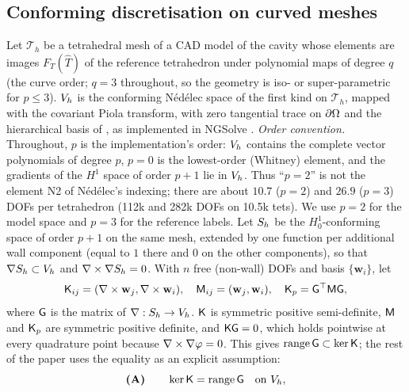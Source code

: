 \subsection{Conforming discretisation on curved meshes}\label{sec:03-discrete}
Let $\mathcal T_h$ be a tetrahedral mesh of a CAD model of the cavity \citep{schoberl1997netgen} whose elements are images
$F_T(\hat T)$ of the reference tetrahedron under polynomial maps of degree $q$ (the curve order; $q=3$ throughout, %
so the geometry is iso- or super-parametric for $p\le 3$). $V_h$ is the conforming Nédélec space of the first kind \citep{nedelec1980mixed} on $\mathcal T_h$, mapped with the covariant Piola transform, with zero
tangential trace on $\partial\Omega$ and the hierarchical basis of \citet{schoberl2005high}, as implemented in NGSolve \citep{schoberl2014cpp11}.
\emph{Order convention.} Throughout, $p$ is the implementation's order: $V_h$ contains the complete vector polynomials of degree $p$, $p=0$ is the lowest-order (Whitney) element,
and the gradients of the $H^1$ space of order $p+1$ lie in $V_h$. Thus ``$p=2$'' is not the element N2 of Nédélec's indexing; there are about $10.7$ ($p=2$) and $26.9$ ($p=3$) DOFs per tetrahedron (112k and 282k DOFs on 10.5k tets). %
We use $p=2$ for the model space and $p=3$ for the reference labels. %
Let $S_h$ be the $H^1_0$-conforming space of order $p+1$ on the same mesh, extended by one function per additional wall component
(equal to $1$ there and $0$ on the other components), so that $\nabla S_h\subset V_h$ and $\nabla\times\nabla S_h=0$.
With $n$ free (non-wall) DOFs and basis $\{\mathbf w_i\}$, let
\begin{equation}\label{eq:03-matrices}
  \Kmat_{ij}=(\curl\mathbf w_j,\curl\mathbf w_i),\quad
  \Mmat_{ij}=(\mathbf w_j,\mathbf w_i),\quad
  \Kp=\Gmat^{\top}\Mmat\Gmat ,
\end{equation}
where $\mathsf{G}$ is the matrix of $\nabla:S_h\to V_h$. $\mathsf{K}$ is symmetric positive semi-definite, $\mathsf{M}$ and $\Kp$ are symmetric positive definite, and $\mathsf{K}\mathsf{G}=0$, which holds pointwise at every quadrature point because
$\nabla\times\nabla\varphi=0$. This gives $\operatorname{range}\mathsf{G}\subset\ker\mathsf{K}$; the rest of the paper uses the equality as an explicit assumption:
\begin{equation}\label{eq:03-A}
  \textbf{(A)}\qquad \ker\mathsf{K}=\operatorname{range}\mathsf{G}\quad\text{on }V_h ,
\end{equation}
